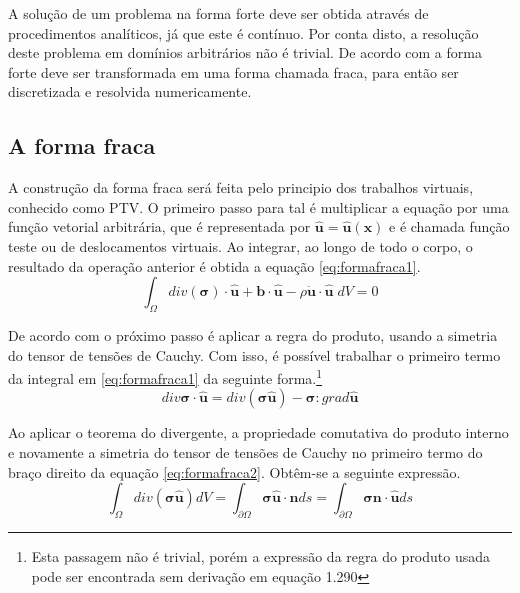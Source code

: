 A solução de um problema na forma forte deve ser obtida através de procedimentos analíticos, já que este é contínuo. Por conta disto, a resolução deste problema em domínios arbitrários não é trivial. De acordo com \cite{Paulo} a forma forte deve ser transformada em uma forma chamada fraca, para então ser discretizada e resolvida numericamente.

\subsection{A forma fraca}
A construção da forma fraca será feita pelo principio dos trabalhos virtuais, conhecido como PTV. O primeiro passo para tal é multiplicar a equação por uma função vetorial arbitrária, que é representada por $ \boldsymbol{\hat{u}} = \boldsymbol{\hat{u}}(\boldsymbol{x})  $ e é chamada função teste ou de deslocamentos virtuais. Ao integrar, ao longo de todo o corpo, o resultado da operação anterior é obtida a equação \ref{eq:formafraca1}.
\begin{equation}
\int_{\Omega} div(\boldsymbol{\sigma}) \cdot \boldsymbol{\hat{u}} + \boldsymbol{b} \cdot \boldsymbol{\hat{u}} - \rho\ddot{\boldsymbol{u}} \cdot \boldsymbol{\hat{u}} \; dV = 0
\label{eq:formafraca1}
\end{equation}

De acordo com \cite{Holzapfel} o próximo passo é aplicar a regra do produto, usando a simetria do tensor de tensões de Cauchy. Com isso, é possível trabalhar o primeiro termo da integral em \ref{eq:formafraca1} da seguinte forma.\footnote{Esta passagem não é trivial, porém a expressão da regra do produto usada pode ser encontrada sem derivação em \cite{Holzapfel} equação 1.290}
\begin{equation}
	div \boldsymbol{\sigma} \cdot \boldsymbol{\hat{u}} = div(\boldsymbol{\sigma}\boldsymbol{\hat{u}}) - \boldsymbol{\sigma} : grad \boldsymbol{\hat{u}}
	\label{eq:formafraca2}
\end{equation}

Ao aplicar o teorema do divergente, a propriedade comutativa do produto interno e novamente a simetria do tensor de tensões de Cauchy no primeiro termo do braço direito da equação \ref{eq:formafraca2}. Obtêm-se a seguinte expressão.
\begin{equation} \label{eq:formafracatrans}
	\int_{\Omega} div(\boldsymbol{\sigma \hat{u}}) dV = \int_{\partial \Omega} \boldsymbol{\sigma \hat{u}} \cdot \boldsymbol{n} ds = \int_{\partial \Omega} \boldsymbol{\sigma n} \cdot \boldsymbol{\hat{u}} ds
\end{equation}

